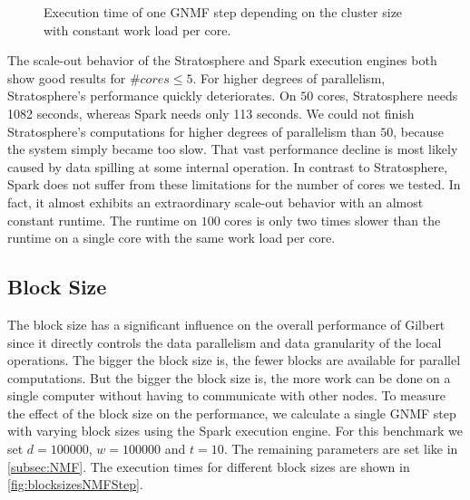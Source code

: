 \begin{figure}[h!]
	\centering
		\caption{Execution time of one GNMF step depending on the cluster size with constant work load per core.}
		\label{fig:nmfNodesRuntime}
\end{figure}

The scale-out behavior of the Stratosphere and Spark execution engines both show good results for $\#cores \le 5$.
For higher degrees of parallelism, Stratosphere's performance quickly deteriorates.
On $50$ cores, Stratosphere needs 1082 seconds, whereas Spark needs only 113 seconds.
We could not finish Stratosphere's computations for higher degrees of parallelism than $50$, because the system simply became too slow.
That vast performance decline is most likely caused by data spilling at some internal operation.
In contrast to Stratosphere, Spark does not suffer from these limitations for the number of cores we tested.
In fact, it almost exhibits an extraordinary scale-out behavior with an almost constant runtime.
The runtime on $100$ cores is only two times slower than the runtime on a single core with the same work load per core.

\subsection{Block Size}

The block size has a significant influence on the overall performance of Gilbert since it directly controls the data parallelism and data granularity of the local operations.
The bigger the block size is, the fewer blocks are available for parallel computations.
But the bigger the block size is, the more work can be done on a single computer without having to communicate with other nodes.
To measure the effect of the block size on the performance, we calculate a single GNMF step with varying block sizes using the Spark execution engine.
For this benchmark we set $d=100000$, $w = 100000$ and $t = 10$.
The remaining parameters are set like in \cref{subsec:NMF}.
The execution times for different block sizes are shown in \cref{fig:blocksizesNMFStep}.


